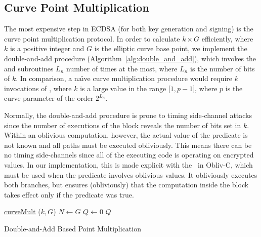 
\subsection{Curve Point Multiplication}\label{subsec:pointMult}

The most expensive step in ECDSA (for both key generation and signing) is the curve point multiplication protocol.  In order to calculate $k \times G$ efficiently, where $k$ is a positive integer and $G$ is the elliptic curve base point, we implement the double-and-add procedure (Algorithm~\ref{alg:double_and_add}), which invokes the  and  subroutines $L_n$ number of times at the most, where $L_n$ is the number of bits of $k$. In comparison, a na\"{\i}ve curve multiplication procedure would require $k$ invocations of , where $k$ is a large value in the range [$1, p - 1$], where $p$ is the curve parameter of the order $2^{L_n}$.

Normally, the double-and-add procedure is prone to timing side-channel attacks since the number of executions of the  block reveals the number of bits set in $k$. Within an oblivious computation, however, the actual value of the predicate is not known and all paths must be executed obliviously. This means there can be no timing side-channels since all of the executing code is operating on encrypted values. 
In our implementation, this is made explicit with the \oblivif\ in Obliv-C, which must be used when the predicate involves oblivious values. It obliviously executes both branches, but ensures (obliviously) that the computation inside the block takes effect only if the predicate was true.

\begin{algorithm}[tb]
    \underline{curveMult} ($k, G$)\;
    $N \gets G$\;
    $Q \gets 0$\;
    \Return $Q$\;
    \caption{Double-and-Add Based Point Multiplication}
    \label{alg:double_and_add}
\end{algorithm}

